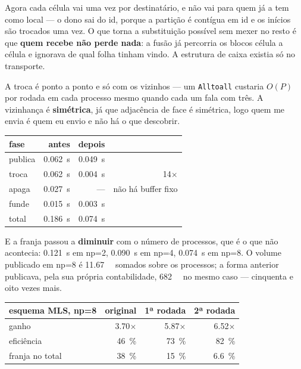 Agora cada célula vai uma vez por destinatário, e não vai para quem já a tem
como local --- o dono sai do id, porque a partição é contígua em id e os inícios
são trocados uma vez. O que torna a substituição possível sem mexer no resto é
que \textbf{quem recebe não perde nada}: a fusão já percorria os blocos célula a
célula e ignorava de qual folha tinham vindo. A estrutura de caixa existia só no
transporte.

A troca é ponto a ponto e só com os vizinhos --- um \texttt{Alltoall} custaria
$O(P)$ por rodada em cada processo mesmo quando cada um fala com três. A
vizinhança é \textbf{simétrica}, já que adjacência de face é simétrica, logo
quem me envia é quem eu envio e não há o que descobrir.

\begin{center}
\begin{tabular}{lrrr}
\toprule
fase & antes & depois & \\
\midrule
publica & \SI{0.062}{\second} & \SI{0.049}{\second} & \\
troca   & \SI{0.062}{\second} & \SI{0.004}{\second} & \num{14}$\times$ \\
apaga   & \SI{0.027}{\second} & ---                  & não há buffer fixo \\
funde   & \SI{0.015}{\second} & \SI{0.003}{\second} & \\
\midrule
total   & \SI{0.186}{\second} & \SI{0.074}{\second} & \\
\bottomrule
\end{tabular}
\end{center}

E a franja passou a \textbf{diminuir} com o número de processos, que é o que
não acontecia: \SI{0.121}{\second} em np=2, \SI{0.090}{\second} em np=4,
\SI{0.074}{\second} em np=8. O volume publicado em np=8 é \SI{11.67}{\mega\byte}
somados sobre os processos; a forma anterior publicava, pela sua própria
contabilidade, \SI{682}{\mega\byte} no mesmo caso --- cinquenta e oito vezes
mais.

\begin{center}
\begin{tabular}{lrrr}
\toprule
esquema MLS, np=8 & original & 1ª rodada & 2ª rodada \\
\midrule
ganho            & \num{3.70}$\times$ & \num{5.87}$\times$ & \num{6.52}$\times$ \\
eficiência       & \SI{46}{\percent}  & \SI{73}{\percent}  & \SI{82}{\percent} \\
franja no total  & \SI{38}{\percent}  & \SI{15}{\percent}  & \SI{6.6}{\percent} \\
\bottomrule
\end{tabular}
\end{center}

